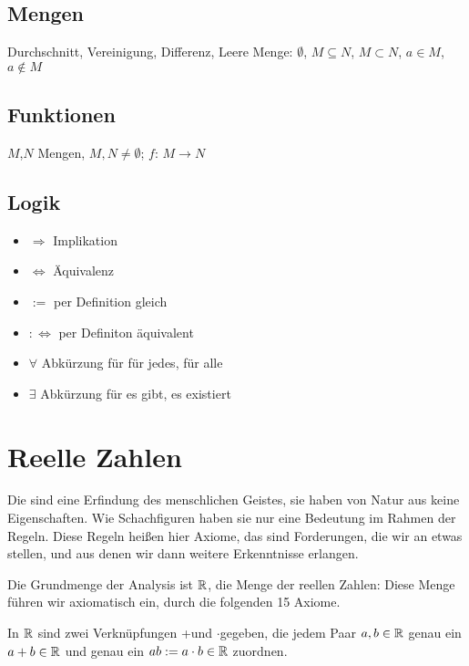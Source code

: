 \documentclass[a4paper,oneside,DIV15,BCOR12mm]{scrbook}
\begin{document}
\section{Mengen}

Durchschnitt, Vereinigung, Differenz, Leere Menge: $\emptyset$, $M\subseteq N$, $M\subset N$, $a \in M$, $a\notin M$

\section{Funktionen}

$M$,$N$ Mengen, $M,N \ne \emptyset$; $f:\, M\rightarrow N$

\section{Logik}

\begin{itemize}
\item $\Rightarrow$ Implikation
\item $\Leftrightarrow$ Äquivalenz
\item $:=$ per Definition gleich
\item $:\Leftrightarrow$ per Definiton äquivalent
\item $\forall$ Abkürzung für \glqq für jedes\grqq, \glqq für alle\grqq
\item $\exists$ Abkürzung für \glqq es gibt\grqq, \glqq es existiert\grqq
\end{itemize}

\renewcommand{\thechapter}{\arabic{chapter}}
\renewcommand{\chaptername}{§}
\setcounter{chapter}{0}

\chapter{Reelle Zahlen}

Die  sind eine Erfindung des menschlichen Geistes, sie haben von Natur aus keine Eigenschaften. Wie Schachfiguren haben sie nur eine Bedeutung im Rahmen der Regeln. Diese Regeln heißen hier Axiome, das sind Forderungen, die wir an etwas stellen, und aus denen wir dann weitere Erkenntnisse erlangen.

Die Grundmenge der Analysis ist $\mathbb{R}$, die Menge der reellen Zahlen: Diese Menge führen wir axiomatisch ein, durch die folgenden 15 Axiome.

In $\mathbb{R}$ sind zwei Verknüpfungen \glqq +\grqq und \glqq $\cdot$\grqq gegeben, die jedem Paar $a,b \in \mathbb{R}$ genau ein $ a+b \in \mathbb{R}$ und genau ein $ ab := a \cdot b \in \mathbb{R}$ zuordnen.
\end{document}
